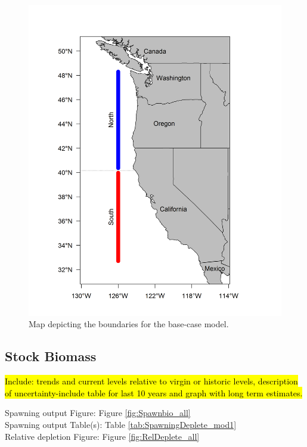 \documentclass[12pt,]{article}
\begin{document}
\begin{figure}[htbp]
\centering
\includegraphics{Figures/assess_region_map.png}
\caption{Map depicting the boundaries for the base-case model.
\label{fig:assess_region_map}}
\end{figure}

\FloatBarrier

\subsection*{Stock Biomass}\label{stock-biomass}

\hl{Include: trends and current levels relative to virgin or historic levels, 
description of uncertainty-include table for last 10 years and graph with 
long term estimates.}

Spawning output Figure: Figure \ref{fig:Spawnbio_all}\\
Spawning output Table(s): Table \ref{tab:SpawningDeplete_mod1}\\
Relative depletion Figure: Figure \ref{fig:RelDeplete_all}
\end{document}
